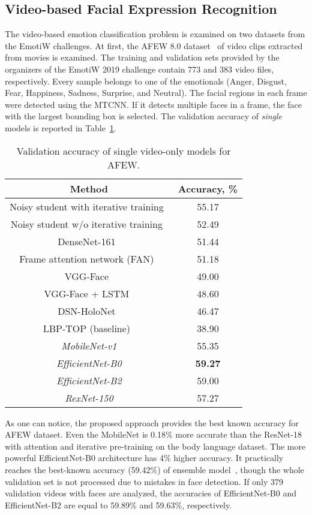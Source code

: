 \documentclass[runningheads]{llncs}
\begin{document}
\subsection{Video-based Facial Expression Recognition}\label{sec:4.2}
The video-based emotion classification problem is examined on two datasets from the EmotiW challenges. At first, the AFEW 8.0 dataset~\cite{dhall2019emotiw} of video clips extracted from movies is examined. The training and validation sets provided by the organizers of the EmotiW 2019 challenge contain 773 and 383 video files, respectively. Every sample belongs to one of the  emotionals (Anger, Disgust, Fear, Happiness, Sadness, Surprise, and Neutral). The facial regions in each frame were detected using the MTCNN. If it detects multiple faces in a frame, the face with the largest bounding box is selected. The validation accuracy of \textit{single} models is reported in Table~\ref{tab3}. 

\begin{table}[t]
\caption{Validation accuracy of single video-only models for AFEW.}\label{tab3}
\centering
\begin{tabular}{|c|c|}
\hline
Method & Accuracy, \%\\
\hline
Noisy student with iterative training~\cite{kumar2020noisy} & 55.17\\
Noisy student w/o iterative training~\cite{kumar2020noisy} & 52.49 \\
DenseNet-161~\cite{liu2018multi} & 51.44\\
Frame attention network (FAN)~\cite{meng2019frame} & 51.18 \\
VGG-Face~\cite{aminbeidokhti2019emotion} & 49.00\\
VGG-Face + LSTM~\cite{vielzeuf2017temporal} & 48.60\\
DSN-HoloNet~\cite{hu2017learning} & 46.47\\
LBP-TOP (baseline)~\cite{dhall2019emotiw} & 38.90\\
\hline
\it MobileNet-v1 & 55.35\\
\it EfficientNet-B0 & \bf 59.27\\
\it EfficientNet-B2 & 59.00\\
\it RexNet-150 & 57.27\\
\hline
\end{tabular}
\end{table}

As one can notice, the proposed approach provides the best known accuracy for AFEW dataset. Even the MobileNet is 0.18\% more accurate than the ResNet-18 with attention and iterative pre-training on the body language dataset. The more powerful EfficientNet-B0 architecture has 4\% higher accuracy. It practically reaches the best-known accuracy (59.42\%) of ensemble model~\cite{bargal2016emotion}, though the whole validation set is not processed due to mistakes in face detection. If only 379 validation videos with faces are analyzed, the accuracies of EfficientNet-B0 and EfficientNet-B2 are equal to 59.89\% and 59.63\%, respectively. 
\end{document}
